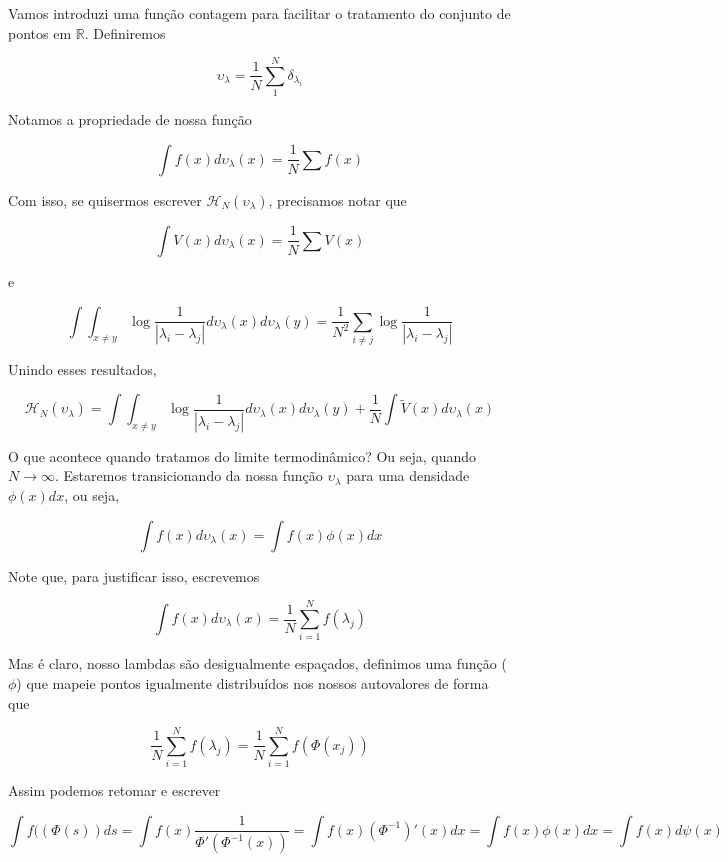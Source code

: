 Vamos introduzi uma função contagem para facilitar o tratamento do conjunto de pontos em $\mathbb{R}$. Definiremos

\begin{equation}
	\upsilon_\lambda = \frac{1}{N} \sum_1^N \delta_{\lambda_i}
\end{equation}

Notamos a propriedade de nossa função

\begin{equation}
	\int f(x) d\upsilon_\lambda(x) = \frac{1}{N} \sum f(x) 
\end{equation}

Com isso, se quisermos escrever $\mathcal{H}_N(\upsilon_\lambda)$, precisamos notar que

\[
	\int V(x) d\upsilon_\lambda(x) = \frac{1}{N} \sum V(x) 
\]

e

\[
	\int \int_{x\neq y} \log{\frac{1}{|\lambda_i - \lambda_j|}}  d\upsilon_\lambda(x) d\upsilon_\lambda(y) = \frac{1}{N^2} \sum_{i \neq j} \log{\frac{1}{|\lambda_i - \lambda_j|}} 
\]

Unindo esses resultados,

\begin{equation}
	\mathcal{H}_N(\upsilon_\lambda) = 	\int \int_{x\neq y} \log{\frac{1}{|\lambda_i - \lambda_j|}}  d\upsilon_\lambda(x) d\upsilon_\lambda(y) + \frac{1}{N} \int \tilde{V}(x) d\upsilon_\lambda(x)
	\label{eq::CoulombGas:: hamilton}
\end{equation}

O que acontece quando tratamos do limite termodinâmico? Ou seja, quando $N\to\infty$. Estaremos transicionando da nossa função $\upsilon_\lambda$ para uma densidade $\phi(x) dx$, ou seja,

\[
	\int f(x) d\upsilon_\lambda(x) =  \int f(x) \phi(x) dx
\]

Note que, para justificar isso, escrevemos

\[
	\int f(x) d\upsilon_\lambda(x) = \frac{1}{N} \sum_{i=1}^N f(\lambda_j)
\]

Mas é claro, nosso lambdas são desigualmente espaçados, definimos uma função ($\phi$) que mapeie pontos igualmente distribuídos nos nossos autovalores de forma que

\[
\frac{1}{N} \sum_{i=1}^N f(\lambda_j) = \frac{1}{N} \sum_{i=1}^N f(\Phi(x_j))
\]

Assim podemos retomar e escrever

\[
	\int f((\Phi(s)) ds = \int f(x) \frac{1}{\Phi'(\Phi^{-1}(x))} = \int f(x) (\Phi^{-1})'(x) dx =  \int f(x) \phi(x) dx= \int f(x) d\psi(x)
\]

